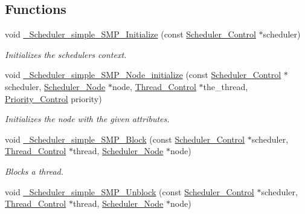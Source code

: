 \subsection*{Functions}
\begin{DoxyCompactItemize}
\item 
void \mbox{\hyperlink{group__RTEMSScoreSchedulerSMPSimple_gad2c703e73574fcce289ee5aab897d49a}{\+\_\+\+Scheduler\+\_\+simple\+\_\+\+S\+M\+P\+\_\+\+Initialize}} (const \mbox{\hyperlink{struct__Scheduler__Control}{Scheduler\+\_\+\+Control}} $\ast$scheduler)
\begin{DoxyCompactList}\small\item\em Initializes the scheduler\textquotesingle{}s context. \end{DoxyCompactList}\item 
void \mbox{\hyperlink{group__RTEMSScoreSchedulerSMPSimple_ga2125dc03b39b2e0d947c82453729ec5e}{\+\_\+\+Scheduler\+\_\+simple\+\_\+\+S\+M\+P\+\_\+\+Node\+\_\+initialize}} (const \mbox{\hyperlink{struct__Scheduler__Control}{Scheduler\+\_\+\+Control}} $\ast$scheduler, \mbox{\hyperlink{structScheduler__Node}{Scheduler\+\_\+\+Node}} $\ast$node, \mbox{\hyperlink{struct__Thread__Control}{Thread\+\_\+\+Control}} $\ast$the\+\_\+thread, \mbox{\hyperlink{group__RTEMSScorePriority_ga59d02b58072d31a9a1cfe644557aefe2}{Priority\+\_\+\+Control}} priority)
\begin{DoxyCompactList}\small\item\em Initializes the node with the given attributes. \end{DoxyCompactList}\item 
void \mbox{\hyperlink{group__RTEMSScoreSchedulerSMPSimple_ga8837c2c44c834f9ce1c7c4df90172375}{\+\_\+\+Scheduler\+\_\+simple\+\_\+\+S\+M\+P\+\_\+\+Block}} (const \mbox{\hyperlink{struct__Scheduler__Control}{Scheduler\+\_\+\+Control}} $\ast$scheduler, \mbox{\hyperlink{struct__Thread__Control}{Thread\+\_\+\+Control}} $\ast$thread, \mbox{\hyperlink{structScheduler__Node}{Scheduler\+\_\+\+Node}} $\ast$node)
\begin{DoxyCompactList}\small\item\em Blocks a thread. \end{DoxyCompactList}\item 
void \mbox{\hyperlink{group__RTEMSScoreSchedulerSMPSimple_gac69ddddef5e79513b45b2679ccbbc145}{\+\_\+\+Scheduler\+\_\+simple\+\_\+\+S\+M\+P\+\_\+\+Unblock}} (const \mbox{\hyperlink{struct__Scheduler__Control}{Scheduler\+\_\+\+Control}} $\ast$scheduler, \mbox{\hyperlink{struct__Thread__Control}{Thread\+\_\+\+Control}} $\ast$thread, \mbox{\hyperlink{structScheduler__Node}{Scheduler\+\_\+\+Node}} $\ast$node)

\end{DoxyCompactItemize}
